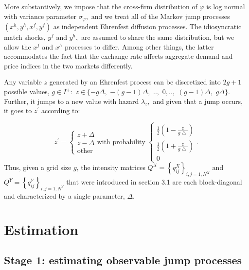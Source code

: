 \documentclass[12pt]{article}
\begin{document}
More substantively, we impose that the cross-firm distribution of $\varphi $
is log normal with variance parameter $\sigma _{\varphi },$ and we treat all
of the Markov jump processes $(x^{h},y^{h},x^{f},y^{f})$ as independent
Ehrenfest diffusion processes. The idiosyncratic match shocks, $y^{f}$ and $%
y^{h},$ are assumed to share the same distribution, but we allow the $x^{f}$
and $x^{h}$ processes to differ. Among other things, the latter accommodates
the fact that the exchange rate affects aggregate demand and price indices
in the two markets differently.

Any variable $z$ generated by an Ehrenfest process can be discretized into $%
2g+1$ possible values, $g\in I^{+}:$ $z\in \{-g\Delta ,$ $-(g-1)\Delta ,$ $%
..,$ $0,..,$ $(g-1)\Delta ,$ $g\Delta \}.$ Further, it jumps to a new value
with hazard $\lambda _{z},$ and given that a jump occurs, it goes to $%
z^{\prime }$ according to:

\begin{equation*}
z^{\prime }=\left\{ 
\begin{array}{c}
z+\Delta \\ 
z-\Delta \\ 
\text{other}%
\end{array}%
\right. \text{with probability }\left\{ 
\begin{array}{c}
\frac{1}{2}\left( 1-\frac{z}{g\bigtriangleup }\right) \\ 
\frac{1}{2}\left( 1+\frac{z}{g\bigtriangleup }\right) \\ 
0%
\end{array}%
\right. .
\end{equation*}%
Thus, given a grid size $g$, the intensity matrices $Q^{X}=\left\{
q_{ij}^{X}\right\} _{i,j=1,N^{X}}$ and $Q^{Y}=\left\{ q_{ij}^{Y}\right\}
_{i,j=1,N^{Y}}$ that were introduced in section 3.1 are each block-diagonal
and characterized by a single parameter, $\Delta $.



\section{Estimation}
\label{sec:Estimation}

\subsection{Stage 1: estimating observable jump processes}
\end{document}
